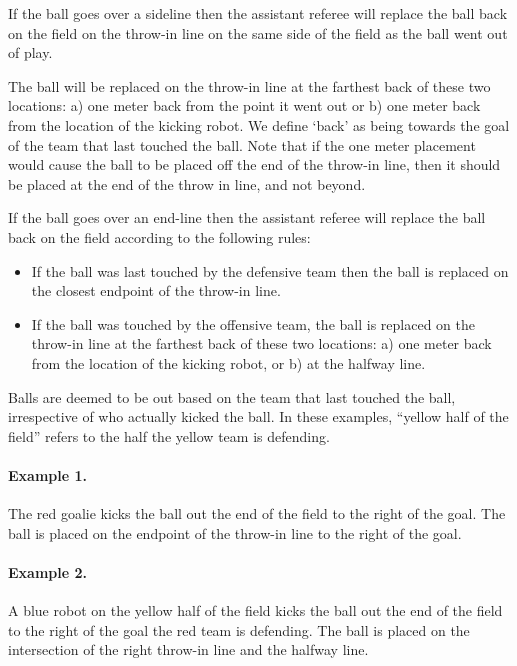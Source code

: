 \documentclass[12pt]{article}
\begin{document}
If the ball goes over a sideline then the assistant referee will replace the ball back on the field on the throw-in line on the same side of the field as the ball went out of play.

The ball will be replaced on the throw-in line at the farthest back of these two locations: a) one meter back from the point it went out or b) one meter back from the location of the kicking robot. We define `back' as being towards the goal of the team that last touched the ball. Note that if the one meter placement would cause the ball to be placed off the end of the throw-in line, then it should be placed at the end of the throw in line, and not beyond.

If the ball goes over an end-line then the assistant referee will replace the ball back on the field according to the following rules:

\begin{itemize}

\item If the ball was last touched by the defensive team then the ball is replaced on the closest endpoint of the throw-in line.

\item If the ball was touched by the offensive team, the ball is replaced on
the throw-in line at the farthest back of these two locations: a) one
meter back from the location of the kicking robot, or b) at the halfway
line.

\end{itemize}

Balls are deemed to be out based on the team that last touched the ball, irrespective of who actually kicked the ball.  In these examples, ``yellow half of the field'' refers to the half the yellow team is defending.

\paragraph{Example 1.} The red goalie kicks the ball out the end of the field to the right of the goal. The ball is placed on the endpoint of the throw-in line to the right of the goal.

\paragraph{Example 2.} A blue robot on the yellow half of the field kicks the ball out the end of the field to the right of the goal the red team is defending. The ball is placed on the intersection of the right throw-in line and the halfway line.
\end{document}
